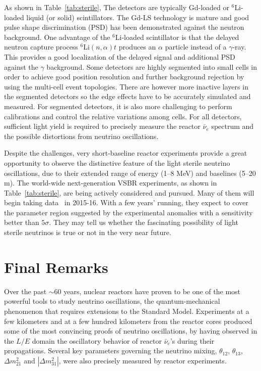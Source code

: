 \documentclass[aps,twocolumn,preprintnumbers,amsmath,superscriptaddress,amssymb,floats,nofootinbib]{revtex4-1}
\begin{document}
As shown in Table~\ref{tab:sterile}, The detectors are typically Gd-loaded or $^{6}$Li-loaded liquid (or solid) scintillators. 
The Gd-LS technology is mature and good pulse shape discrimination (PSD) has been demonstrated against the neutron background. One advantage of the $^{6}$Li-loaded scintillator is that the delayed neutron capture process $^{6}$Li$(n,\alpha)t$ produces an $\alpha$ particle instead of a $\gamma$-ray. 
This provides a good localization of the delayed signal and additional PSD against the $\gamma$ background. 
Some detectors are highly segmented into small cells in order to achieve good position resolution and further background rejection by using the multi-cell event topologies. 
There are however more inactive layers in the segmented detectors so the edge effects have to be accurately simulated and measured.
For segmented detectors, it is also more challenging to perform calibrations and control the relative variations among cells. 
For all detectors, sufficient light yield is required to precisely measure the reactor $\bar\nu_e$ spectrum and the possible distortions from neutrino oscillations.


Despite the challenges, very short-baseline reactor experiments provide a great opportunity to observe the distinctive feature of the light sterile neutrino oscillations, due to their extended range of energy (1--8 MeV) and baselines (5--20 m). 
The world-wide next-generation VSBR experiments, as shown in Table~\ref{tab:sterile}, are being actively considered and pursued.
Many of them will begin taking data~\cite{Lhuillier-Neutrino14} in 2015-16. With a few years' running, they expect to cover the parameter region suggested by the experimental anomalies with a sensitivity better than $5\sigma$. 
They may tell us whether the fascinating possibility of light sterile neutrinos is true or not in the very near future.


\section{Final Remarks} 
\label{sec:final}

Over the past $\sim$60 years, nuclear reactors have proven to be one of the most powerful tools to study neutrino oscillations, the quantum-mechanical phenomenon that requires extensions to the Standard Model. Experiments at a few kilometers and at a few hundred kilometers from the reactor cores produced some of the most convincing proofs of neutrino oscillations, by having observed in the $L/E$ domain the oscillatory behavior of reactor $\bar\nu_e$'s during their propagations. Several key parameters governing the neutrino mixing, $\theta_{12}$, $\theta_{13}$, $\Delta{m}^2_{21}$ and $|\Delta{m}^2_{31}|$, were also precisely measured by reactor experiments. 
\end{document}
